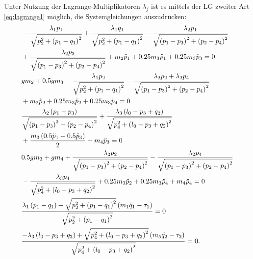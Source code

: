 Unter Nutzung der Lagrange-Multiplikatoren $\lambda_j$ ist es mittels der LG zweiter Art \eqref{eq:lagrange1} möglich, die Systemgleichungen auszudrücken:
\begin{subequations}
	\begin{flalign}
		&- \frac{\lambda_{1} p_{1}}{\sqrt{p_{2}^{2} + \left(p_{1} - q_{1}\right)^{2}}} + \frac{\lambda_{1} q_{1}}{\sqrt{p_{2}^{2} + \left(p_{1} - q_{1}\right)^{2}}} - \frac{\lambda_{2} p_{1}}{\sqrt{\left(p_{1} - p_{3}\right)^{2} + \left(p_{2} - p_{4}\right)^{2}}} \nonumber \\
		&+ \frac{\lambda_{2} p_{3}}{\sqrt{\left(p_{1} - p_{3}\right)^{2} + \left(p_{2} - p_{4}\right)^{2}}} + m_{2} \ddot{p}_{1} + 0.25 m_{3} \ddot{p}_{1} + 0.25 m_{3} \ddot{p}_{3} = 0\\
		&g m_{2} + 0.5 g m_{3} - \frac{\lambda_{1} p_{2}}{\sqrt{p_{2}^{2} + \left(p_{1} - q_{1}\right)^{2}}} - \frac{\lambda_{2} p_{2} + \lambda_{2} p_{4}}{\sqrt{\left(p_{1} - p_{3}\right)^{2} + \left(p_{2} - p_{4}\right)^{2}}} \nonumber \\
		&+ m_{2} \ddot{p}_{2} + 0.25 m_{3} \ddot{p}_{2} + 0.25 m_{3} \ddot{p}_{4} = 0\\
		&\frac{\lambda_{2} \left(p_{1} - p_{3}\right)}{\sqrt{\left(p_{1} - p_{3}\right)^{2} + \left(p_{2} - p_{4}\right)^{2}}} + \frac{\lambda_{3} \left(l_{0} - p_{3} + q_{2}\right)}{\sqrt{p_{4}^{2} + \left(l_{0} - p_{3} + q_{2}\right)^{2}}} \noindent \\
		&+ \frac{m_{3} \left(0.5 \ddot{p}_{1} + 0.5 \ddot{p}_{3}\right)}{2} + m_{4} \ddot{p}_{3} = 0\\
		&0.5 g m_{3} + g m_{4} + \frac{\lambda_{2} p_{2}}{\sqrt{\left(p_{1} - p_{3}\right)^{2} + \left(p_{2} - p_{4}\right)^{2}}} - \frac{\lambda_{2} p_{4}}{\sqrt{\left(p_{1} - p_{3}\right)^{2} + \left(p_{2} - p_{4}\right)^{2}}} \nonumber \\ 
		&- \frac{\lambda_{3} p_{4}}{\sqrt{p_{4}^{2} + \left(l_{0} - p_{3} + q_{2}\right)^{2}}} + 0.25 m_{3} \ddot{p}_{2} + 0.25 m_{3} \ddot{p}_{4} + m_{4} \ddot{p}_{4} = 0\\
		&\frac{\lambda_{1} \left(p_{1} - q_{1}\right) + \sqrt{p_{2}^{2} + \left(p_{1} - q_{1}\right)^{2}} \left(m_{1} \ddot{q}_{1} - \tau_{1}\right)}{\sqrt{p_{2}^{2} + \left(p_{1} - q_{1}\right)^{2}}} = 0\\
		&\frac{- \lambda_{3} \left(l_{0} - p_{3} + q_{2}\right) + \sqrt{p_{4}^{2} + \left(l_{0} - p_{3} + q_{2}\right)^{2}} \left(m_{5} \ddot{q}_{2} - \tau_{2}\right)}{\sqrt{p_{4}^{2} + \left(l_{0} - p_{3} + q_{2}\right)^{2}}} = 0.
	\end{flalign}
\end{subequations}

